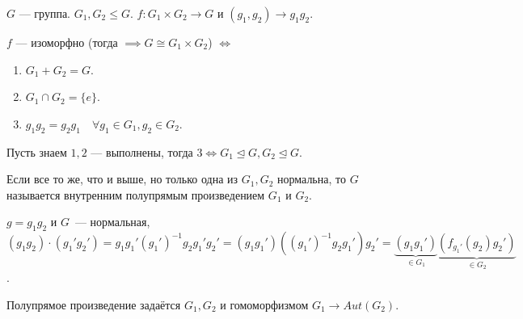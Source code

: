 \begin{statement}
    $G$ --- группа.  $G_1, G_2 \le G$. $f\!: G_1 \times G_2 \to G$ и $(g_1,g_2) \to g_1g_2$.

    $f$ --- изоморфно (тогда $\implies G \cong G_1 \times G_2$) $\iff$
    \begin{enumerate}
        \item $G_1+G_2 = G$.
        \item $G_1 \cap G_2 = \{e\}$.
        \item $g_1g_2 = g_2g_1\quad \forall g_1 \in G_1, g_2 \in G_2$.
    \end{enumerate}
\end{statement}
\begin{exerc}
    Пусть знаем $1, 2$ --- выполнены, тогда  $3 \iff G_1 \trianglelefteq G, G_2 \trianglelefteq G$.
\end{exerc}
\begin{definition}
    Если все то же, что и выше, но только одна из $G_1, G_2$ нормальна, то $G$ называется внутренним полупрямым произведением  $G_1$ и $G_2$.

    $g = g_1g_2$ и $G$~--- нормальная, $(g_1g_2) \cdot (g_1' g_2') = g_1g_1'(g_1')^{-1}g_2g_1'g_2' = (g_1g_1')((g_1')^{-1}g_2g_1')g_2' = \underbrace{(g_1g_1')}_{\in G_1}\underbrace{(f_{g_1'}(g_2)g_2')}_{\in G_2}$.

    Полупрямое произведение задаётся $G_1, G_2$ и гомоморфизмом $G_1 \to Aut(G_2)$.
\end{definition}
